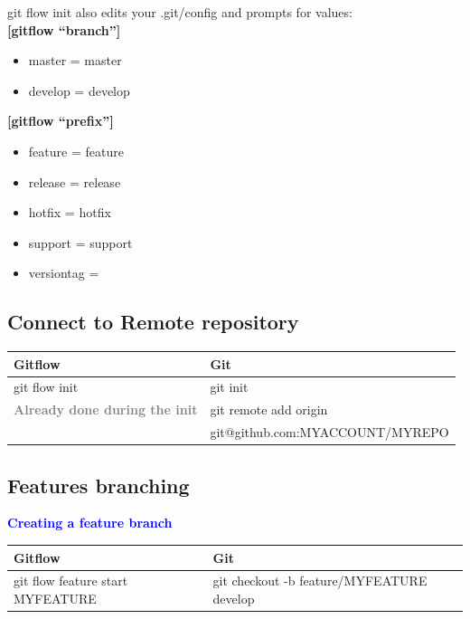 \documentclass{tufte-handout}
\begin{document}
		\vspace{0.25cm}
		git flow init also edits your .git/config and prompts for values:\\ 		\vspace{0.25cm}		
		\textbf{{[}gitflow ``branch''{]}}
			\begin{itemize}
				\item \small{master = master}
				\item \small{develop = develop}
			\end{itemize}
				\textbf{{[}gitflow ``prefix''{]}} 
			\begin{itemize}
				\item \small{feature = feature}
				\item \small{release = release}
				\item \small{hotfix = hotfix}
				\item \small{support = support}
				\item \small{versiontag = }
			\end{itemize}
	

		\subsection{Connect to Remote repository}
		
		\begin{table}[ht]
			\centering
			\selectfont
			\begin{tabular}{ll}
				Gitflow & Git \\
				\midrule
				git flow init & git init \\
				\textbf{\textcolor{gray}{Already done during the init}} & git remote add origin \\
				& git@github.com:MYACCOUNT/MYREPO \\
			\end{tabular}
			\label{tab:normaltab}
		\end{table}
		\medskip %
		
		\clearpage
		

		\subsection{Features branching}
		
		\hspace{1em}\textbf{\textcolor{blue}{Creating a feature branch}}
		
		\begin{table}[ht]
			\centering
			\selectfont
			\begin{tabular}{ll}
				Gitflow & Git \\
				\midrule
				git flow feature start MYFEATURE & git checkout -b feature/MYFEATURE develop \\
			\end{tabular}
			\label{tab:normaltab}
		\end{table}
		\medskip %
		
\end{document}
